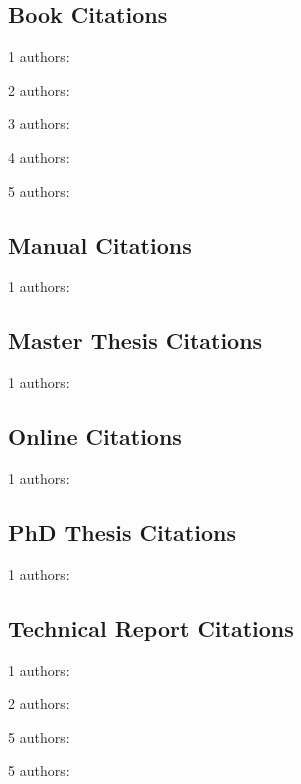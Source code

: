 \documentclass[
  a4paper, %
  11pt, %
]{article}
\newcommand{\nauthors}[1]{#1 authors: }
\begin{document}
\printbibliography[type=article, title=Article References]

\subsection{Book Citations}
\indent
\par\nauthors{1}\cite{AnkelSimons2007}
\par\nauthors{2}\cite{Bogitsh2013}
\par\nauthors{3}\cite{Taylor2016}
\par\nauthors{4}\cite{Modry2015}
\par\nauthors{5}\cite{Modry2017}

\printbibliography[type=book, title=Book References]


\subsection{Manual Citations}
\indent
\par\nauthors{1}\cite{Zoos2022}

\printbibliography[type=manual, title=Manual References]


\subsection{Master Thesis Citations}
\indent
\par\nauthors{1}\cite{Carvalho2002}

\printbibliography[type=masterthesis, title=Masterthesis References]


\subsection{Online Citations}
\indent
\par\nauthors{1}\cite{ZooBarcelona:Timeline}

\printbibliography[type=manual, title=Online References]


\subsection{PhD Thesis Citations}
\indent
\par\nauthors{1}\cite{Balan2017}

\printbibliography[type=phdthesis, title=Phdthesis References]


\subsection{Technical Report Citations}
\indent
\par\nauthors{1}\cite{Fiby2020}
\par\nauthors{2}\cite{Miller2011}
\par\nauthors{5}\cite{Abello2017}
\par\nauthors{5}\cite{Duque2018}

\printbibliography[type=techreport, title=Techreport References]



\end{document}
